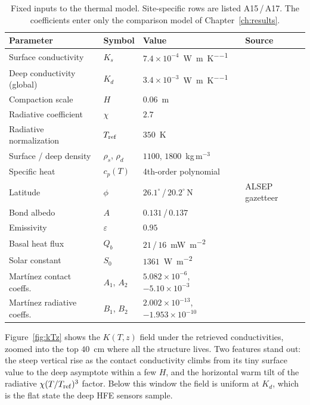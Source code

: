 \documentclass[11pt,a4paper,oneside]{report}
\newcommand{\Kd}{\ensuremath{K_d}}
\newcommand{\Ks}{\ensuremath{K_s}}
\newcommand{\Qb}{\ensuremath{Q_b}}
\newcommand{\mWm}{\si{\milli\watt\per\square\meter}}
\begin{document}
\begin{table}[htbp]
  \centering\small
  \caption[Fixed inputs to the thermal model]{Fixed inputs to the
  thermal model. Site-specific rows are listed A15\,/\,A17. The
  \citet{martinez2021} coefficients enter only the comparison model of
  Chapter~\ref{ch:results}.}
  \label{tab:params}
  \begin{tabular}{@{}llll@{}}
    \toprule
    Parameter & Symbol & Value & Source \\
    \midrule
    Surface conductivity & \Ks & $7.4\times10^{-4}$~\si{\watt\per\meter\per\kelvin} & \citet{hayne2017} \\
    Deep conductivity (global) & \Kd & $3.4\times10^{-3}$~\si{\watt\per\meter\per\kelvin} & \citet{hayne2017} \\
    Compaction scale & $H$ & $0.06$~m & \citet{hayne2017} \\
    Radiative coefficient & $\chi$ & $2.7$ & \citet{hayne2017} \\
    Radiative normalization & $T_{\rm ref}$ & $350$~K & \citet{hayne2017} \\
    Surface / deep density & $\rho_s$, $\rho_d$ & $1100$, $1800$~kg\,m$^{-3}$ & \citet{hayne2017} \\
    Specific heat & $c_p(T)$ & 4th-order polynomial & \citet{hemingway1973} \\
    Latitude & $\phi$ & $26.1^{\circ}$\,/\,$20.2^{\circ}$\,N & ALSEP gazetteer \\
    Bond albedo & $A$ & $0.131$\,/\,$0.137$ & \citet{vasavada2012} \\
    Emissivity & $\varepsilon$ & $0.95$ & \citet{bandfield2015} \\
    Basal heat flux & \Qb & $21$\,/\,$16$~\mWm & \citet{langseth1976} \\
    Solar constant & $S_0$ & $1361$~\si{\watt\per\square\meter} & \citet{kopp2011} \\
    \midrule
    Mart\'inez contact coeffs. & $A_1$, $A_2$ & $5.082\times10^{-6}$, $-5.10\times10^{-3}$ & \citet{martinez2021} \\
    Mart\'inez radiative coeffs. & $B_1$, $B_2$ & $2.002\times10^{-13}$, $-1.953\times10^{-10}$ & \citet{martinez2021} \\
    \bottomrule
  \end{tabular}
\end{table}

Figure~\ref{fig:kTz} shows the $K(T,z)$ field under the retrieved
conductivities, zoomed into the top $40$~cm where all the structure
lives. Two features stand out: the steep vertical rise as the contact
conductivity climbs from its tiny surface value to the deep asymptote
within a few $H$, and the horizontal warm tilt of the radiative
$\chi(T/T_{\rm ref})^3$ factor. Below this window the field is uniform
at \Kd, which is the flat state the deep HFE sensors sample.
\end{document}

